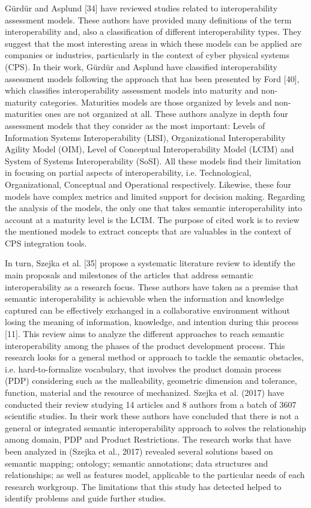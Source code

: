 \documentclass[peerreview]{IEEEtran}
\begin{document}
Gürdür and Asplund [34] have reviewed studies related to interoperability assessment models. These authors have provided many definitions of the term interoperability and, also a classification of different interoperability types. They suggest that the most interesting areas in which these models can be applied are companies or industries, particularly in the context of cyber physical systems (CPS). In their work, Gürdür and Asplund have classified interoperability assessment models following the approach that has been presented by Ford  [40], which classifies interoperability assessment models into maturity and non-maturity categories.  Maturities models are those organized by levels and non-maturities ones are not organized at all. These authors analyze in depth four assessment models that they consider as the most important: Levels of Information Systems Interoperability (LISI), Organizational Interoperability Agility Model (OIM), Level of Conceptual Interoperability Model (LCIM) and System of Systems Interoperability (SoSI). All these models find their limitation in focusing on partial aspects of interoperability, i.e. Technological, Organizational, Conceptual and Operational respectively. Likewise, these four models have complex metrics and limited support for decision making. Regarding the analysis of the models, the only one that takes semantic interoperability into account at a maturity level is the LCIM. The purpose of cited work is to review the mentioned models to extract concepts that are valuables in the context of CPS integration tools.


In turn, Szejka et al. [35] propose a systematic literature review to identify the main proposals and milestones of the articles that address semantic interoperability as a research focus. These authors have taken as a premise that semantic interoperability is achievable when the information and knowledge captured can be effectively exchanged in a collaborative environment without losing the meaning of information, knowledge, and intention during this process [11]. This review aims to analyze the different approaches to reach semantic interoperability among the phases of the product development process. This research looks for a general method or approach to tackle the semantic obstacles, i.e. hard-to-formalize vocabulary, that involves the product domain process (PDP) considering such as the malleability, geometric dimension and tolerance, function, material and the resource of mechanized. Szejka et al. (2017) have conducted their review studying 14 articles and 8 authors from a batch of 3607 scientific studies. In their work these authors have concluded that there is not a general or integrated semantic interoperability approach to solves the relationship among domain, PDP and Product Restrictions. The research works that have been analyzed in (Szejka et al., 2017) revealed several solutions based on semantic mapping; ontology; semantic annotations; data structures and relationships; as well as features model, applicable to the particular needs of each research workgroup. The limitations that this study has detected helped to identify problems and guide further studies. 
\end{document}

